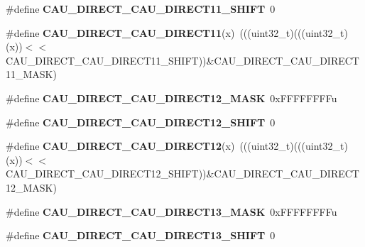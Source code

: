 \begin{DoxyCompactItemize}
\item 
\#define {\bfseries C\+A\+U\+\_\+\+D\+I\+R\+E\+C\+T\+\_\+\+C\+A\+U\+\_\+\+D\+I\+R\+E\+C\+T11\+\_\+\+S\+H\+I\+FT}~0\hypertarget{group__CAU__Register__Masks_ga5a79ec46736566014503f1858c92f19e}{}\label{group__CAU__Register__Masks_ga5a79ec46736566014503f1858c92f19e}

\item 
\#define {\bfseries C\+A\+U\+\_\+\+D\+I\+R\+E\+C\+T\+\_\+\+C\+A\+U\+\_\+\+D\+I\+R\+E\+C\+T11}(x)~(((uint32\+\_\+t)(((uint32\+\_\+t)(x))$<$$<$C\+A\+U\+\_\+\+D\+I\+R\+E\+C\+T\+\_\+\+C\+A\+U\+\_\+\+D\+I\+R\+E\+C\+T11\+\_\+\+S\+H\+I\+FT))\&C\+A\+U\+\_\+\+D\+I\+R\+E\+C\+T\+\_\+\+C\+A\+U\+\_\+\+D\+I\+R\+E\+C\+T11\+\_\+\+M\+A\+SK)\hypertarget{group__CAU__Register__Masks_gae76a60c1e2729fcd978742fd44100675}{}\label{group__CAU__Register__Masks_gae76a60c1e2729fcd978742fd44100675}

\item 
\#define {\bfseries C\+A\+U\+\_\+\+D\+I\+R\+E\+C\+T\+\_\+\+C\+A\+U\+\_\+\+D\+I\+R\+E\+C\+T12\+\_\+\+M\+A\+SK}~0x\+F\+F\+F\+F\+F\+F\+F\+Fu\hypertarget{group__CAU__Register__Masks_gaa2ee16a89961959b8a4a936d5f6ce49c}{}\label{group__CAU__Register__Masks_gaa2ee16a89961959b8a4a936d5f6ce49c}

\item 
\#define {\bfseries C\+A\+U\+\_\+\+D\+I\+R\+E\+C\+T\+\_\+\+C\+A\+U\+\_\+\+D\+I\+R\+E\+C\+T12\+\_\+\+S\+H\+I\+FT}~0\hypertarget{group__CAU__Register__Masks_gaebc337b0562194197195ce07c9f4c7d0}{}\label{group__CAU__Register__Masks_gaebc337b0562194197195ce07c9f4c7d0}

\item 
\#define {\bfseries C\+A\+U\+\_\+\+D\+I\+R\+E\+C\+T\+\_\+\+C\+A\+U\+\_\+\+D\+I\+R\+E\+C\+T12}(x)~(((uint32\+\_\+t)(((uint32\+\_\+t)(x))$<$$<$C\+A\+U\+\_\+\+D\+I\+R\+E\+C\+T\+\_\+\+C\+A\+U\+\_\+\+D\+I\+R\+E\+C\+T12\+\_\+\+S\+H\+I\+FT))\&C\+A\+U\+\_\+\+D\+I\+R\+E\+C\+T\+\_\+\+C\+A\+U\+\_\+\+D\+I\+R\+E\+C\+T12\+\_\+\+M\+A\+SK)\hypertarget{group__CAU__Register__Masks_gac4ca5dade23d4243ac71ae0d9ec57d43}{}\label{group__CAU__Register__Masks_gac4ca5dade23d4243ac71ae0d9ec57d43}

\item 
\#define {\bfseries C\+A\+U\+\_\+\+D\+I\+R\+E\+C\+T\+\_\+\+C\+A\+U\+\_\+\+D\+I\+R\+E\+C\+T13\+\_\+\+M\+A\+SK}~0x\+F\+F\+F\+F\+F\+F\+F\+Fu\hypertarget{group__CAU__Register__Masks_ga5735753e1d7d46e22b92d806218045b2}{}\label{group__CAU__Register__Masks_ga5735753e1d7d46e22b92d806218045b2}

\item 
\#define {\bfseries C\+A\+U\+\_\+\+D\+I\+R\+E\+C\+T\+\_\+\+C\+A\+U\+\_\+\+D\+I\+R\+E\+C\+T13\+\_\+\+S\+H\+I\+FT}~0\hypertarget{group__CAU__Register__Masks_ga941037be28db6fbd833f5202ad2f21a5}{}\label{group__CAU__Register__Masks_ga941037be28db6fbd833f5202ad2f21a5}


\end{DoxyCompactItemize}

